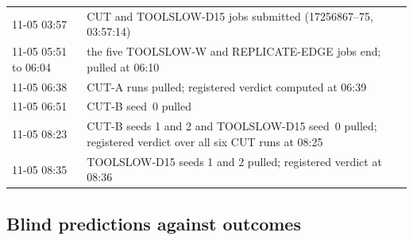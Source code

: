 \begin{table}[tbp]
\begin{tabular}{@{}p{2.3cm} >{\raggedright\arraybackslash}p{14.4cm}@{}}
11-05 03:57 & CUT and TOOLSLOW-D15 jobs submitted (17256867--75, 03:57:14)\\
11-05 05:51 to 06:04 & the five TOOLSLOW-W and REPLICATE-EDGE jobs end; pulled at 06:10\\
11-05 06:38 & CUT-A runs pulled; registered verdict computed at 06:39\\
11-05 06:51 & CUT-B seed~0 pulled\\
11-05 08:23 & CUT-B seeds 1 and 2 and TOOLSLOW-D15 seed~0 pulled; registered verdict over all six CUT runs at 08:25\\
11-05 08:35 & TOOLSLOW-D15 seeds 1 and 2 pulled; registered verdict at 08:36\\
\bottomrule
\end{tabular}
\end{table}

\subsection{Blind predictions against outcomes}\label{sec:blind}

